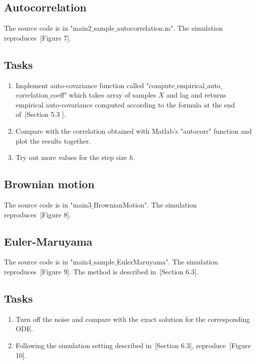 \documentclass{scrartcl}
\begin{document}
\subsection{Autocorrelation}

The source code is in "main2$\_$sample$\_$autocorrelation.m". The simulation reproduces~\cite{sanz2014markov}[Figure 7].

\subsection{Tasks}
\begin{enumerate}
\item Implement auto-covariance function called "compute$\_$empirical$\_$auto$\_$correlation$\_$coeff" which takes array of samples $X$ and lag and returns empirical auto-covariance computed according to the formula at the end of~\cite{sanz2014markov}[Section 5.3 ].
\item Compare with the correlation obtained with Matlab's "autocorr" function and plot the results together.
\item Try out more values for the step size $h$.
\end{enumerate}


\subsection{Brownian motion}

The source code is in "main3$\_$BrownianMotion". The simulation reproduces~\cite{sanz2014markov}[Figure 8].



\subsection{Euler-Maruyama}

The source code is in "main4$\_$sample$\_$EulerMaruyama". The simulation reproduces~\cite{sanz2014markov}[Figure 9]. The method is described in~\cite{sanz2014markov}[Section 6.3].

\subsection{Tasks}
\begin{enumerate}
\item Turn off the noise and compare with the exact solution for the corresponding ODE. 
\item Following the simulation setting described in~\cite{sanz2014markov}[Section 6.3], reproduce~\cite{sanz2014markov}[Figure 10].
\end{enumerate}
\end{document}
